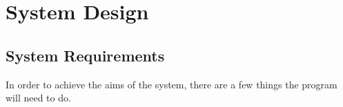 
\chapter{System Design}

\label{Chapter3}

\section{System Requirements}
In order to achieve the aims of the system, there are a few things the program will need to do.



